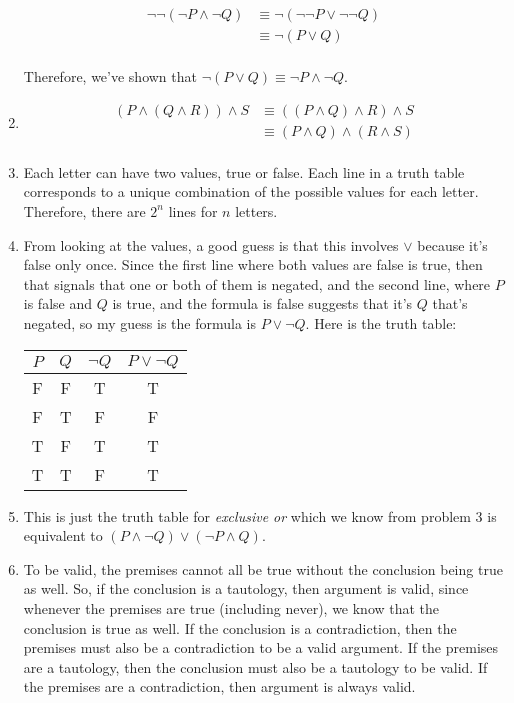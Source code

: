 \documentclass{article}
\begin{document}
\begin{enumerate}
  \begin{equation*}
    \begin{aligned}
      \lnot \lnot (\lnot P \land \lnot Q) & \equiv \lnot (\lnot \lnot P \lor \lnot \lnot Q) \\
      & \equiv \lnot (P \lor Q) \\
      \end{aligned}
  \end{equation*}

  Therefore, we've shown that $\lnot (P \lor Q) \equiv \lnot P \land \lnot Q$.

\item
  \begin{equation*}
    \begin{aligned}
      (P \land (Q \land R)) \land S & \equiv ((P \land Q) \land R) \land S \\
      & \equiv (P \land Q) \land (R \land S) \\
    \end{aligned}
  \end{equation*}

\item Each letter can have two values, true or false.  Each line in a truth table corresponds to a unique combination of the possible values for each letter.  Therefore, there are $2^n$ lines for $n$ letters.

\item From looking at the values, a good guess is that this involves $\lor$ because it's false only once.  Since the first line where both values are false is true, then that signals that one or both of them is negated, and the second line, where $P$ is false and $Q$ is true, and the formula is false suggests that it's $Q$ that's negated, so my guess is the formula is $P \lor \lnot Q$.  Here is the truth table:

  \begin{tabular}{c c c c}
    $P$ & $Q$ & $\lnot Q$ & $P \lor \lnot Q$ \\ \hline
    F & F & T & T \\
    F & T & F & F \\
    T & F & T & T \\
    T & T & F & T \\
    \end{tabular}

\item This is just the truth table for \textit{exclusive or} which we know from problem 3 is equivalent to $(P \land \lnot Q) \lor (\lnot P \land Q)$.

\item To be valid, the premises cannot all be true without the conclusion being true as well.  So, if the conclusion is a tautology, then argument is valid, since whenever the premises are true (including never), we know that the conclusion is true as well.  If the conclusion is a contradiction, then the premises must also be a contradiction to be a valid argument.  If the premises are a tautology, then the conclusion must also be a tautology to be valid.  If the premises are a contradiction, then argument is always valid.
\end{enumerate}
\end{document}

